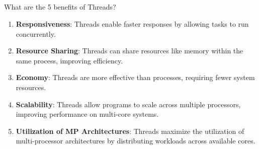 \subsection*{} What are the 5 benefits of Threads?
    \begin{enumerate}[label=\arabic*.]
        \item \textbf{Responsiveness}: Threads enable faster responses by allowing tasks to run concurrently.
        \item \textbf{Resource Sharing}: Threads can share resources like memory within the same process, improving efficiency.
        \item \textbf{Economy}: Threads are more effective than processes, requiring fewer system resources.
        \item \textbf{Scalability}: Threads allow programs to scale across multiple processors, improving performance on multi-core systems.
        \item \textbf{Utilization of MP Architectures}: Threads maximize the utilization of multi-processor architectures by distributing workloads across available cores.
    \end{enumerate}
    